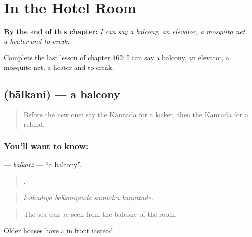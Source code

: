 
\chapter{In the Hotel Room}
\label{ch:ka-in-the-hotel-room}

\begin{chapteropening}
\textbf{By the end of this chapter:} \emph{I can say a balcony, an elevator, a mosquito net, a heater and to creak.}

Complete the last lesson of chapter 462: I can say a balcony, an elevator, a mosquito net, a heater and to creak.
\end{chapteropening}

\section[\texorpdfstring{\kn{ಬಾಲ್ಕನಿ} (bālkani)}{ಬಾಲ್ಕನಿ (bālkani)}]{ (bālkani) — a balcony}

\label{lesson:KA-C462-balkani}



\begin{quote}
Before the new one: say the Kannada for a locker, then the Kannada for a refund.
\end{quote}

\subsection*{You'll want to know: }
\textbf{} — \emph{bālkani} — \textquotedblleft{}a balcony\textquotedblright{}.

\begin{quote}
   .
\end{quote}

\begin{quote}
\emph{koṭhaḍiya bālkaniyinda samudra kāṇuttade.}
\end{quote}

\begin{quote}
The sea can be seen from the balcony of the room.
\end{quote}

Older houses have a  in front instead.

